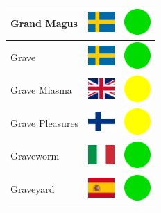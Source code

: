 \documentclass[12pt, a4paper, twoside]{report}
\begin{document}
\begin{center}
\begin{longtable}{|p{5cm}|p{2cm}|p{2cm}|}
 Grand Magus                                                & \includegraphics[width=1cm]{4x3/se} &   \includegraphics[width=1cm]{likes/y} \\ \hline
 Grave                                                      & \includegraphics[width=1cm]{4x3/se} &   \includegraphics[width=1cm]{likes/y} \\ \hline
 Grave Miasma                                               & \includegraphics[width=1cm]{4x3/gb} &   \includegraphics[width=1cm]{likes/m} \\ \hline
 Grave Pleasures                                            & \includegraphics[width=1cm]{4x3/fi} &   \includegraphics[width=1cm]{likes/m} \\ \hline
 Graveworm                                                  & \includegraphics[width=1cm]{4x3/it} &   \includegraphics[width=1cm]{likes/y} \\ \hline
 Graveyard                                                  & \includegraphics[width=1cm]{4x3/es} &   \includegraphics[width=1cm]{likes/y} \\ \hline

\end{longtable}
\end{center}
\end{document}
